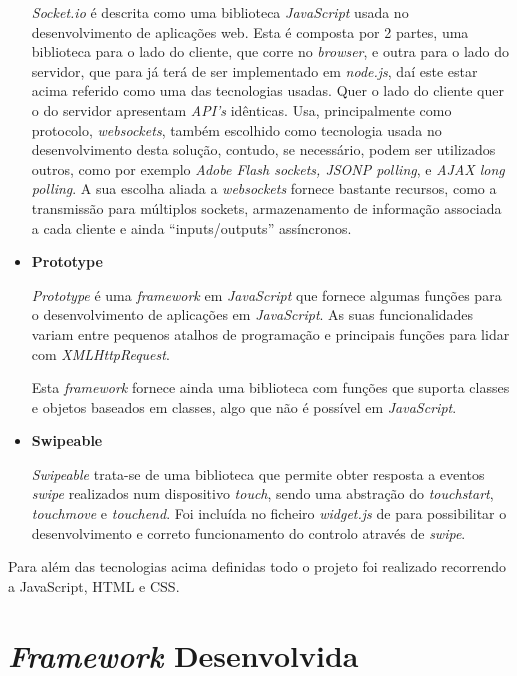 \begin{itemize}
\textit{Socket.io} é descrita como uma biblioteca \textit{JavaScript} usada no desenvolvimento de aplicações web. Esta é composta por 2 partes, uma biblioteca para o lado do cliente, que corre no \textit{browser}, e outra para o lado do servidor, que para já terá de ser implementado em \textit{node.js}, daí este estar acima referido como uma das tecnologias usadas. Quer o lado do cliente quer o do servidor apresentam \textit{API’s} idênticas. 
Usa, principalmente como protocolo, \textit{websockets}, também escolhido como tecnologia usada no desenvolvimento desta solução, contudo, se necessário, podem ser utilizados outros, como por exemplo \textit{Adobe Flash sockets, JSONP polling}, e \textit{AJAX long polling}. 
A sua escolha aliada a \textit{websockets} fornece bastante recursos, como a transmissão para múltiplos sockets, armazenamento de informação associada a cada cliente e ainda ``inputs/outputs'' assíncronos. 

\item \textbf{Prototype}

\textit{Prototype} é uma \textit{framework} em \textit{JavaScript} que fornece algumas funções para o desenvolvimento de aplicações em \textit{JavaScript}. As suas funcionalidades variam entre pequenos atalhos de programação e principais funções para lidar com \textit{XMLHttpRequest}.

Esta \textit{framework} fornece ainda uma biblioteca com funções que suporta classes e objetos baseados em classes, algo que não é possível em \textit{JavaScript}.

\item \textbf{Swipeable}

\textit{Swipeable} trata-se de uma biblioteca que permite obter resposta a eventos \textit{swipe} realizados num dispositivo \textit{touch}, sendo uma abstração do \textit{touchstart}, \textit{touchmove} e \textit{touchend}. 
Foi incluída no ficheiro \textit{widget.js} de para possibilitar o desenvolvimento e correto funcionamento do controlo através de \textit{swipe}.

\end{itemize}

Para além das tecnologias acima definidas todo o projeto foi realizado recorrendo a JavaScript, HTML e CSS. 


\section{\textit{Framework} Desenvolvida} \label{sec:framework}

